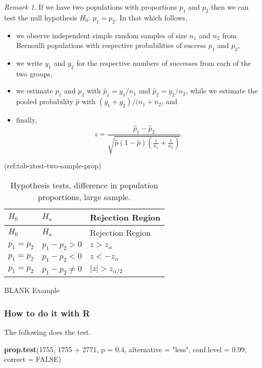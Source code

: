 \documentclass[]{book}
\newenvironment{Shaded}{\begin{snugshade}}{\end{snugshade}}
\newcommand{\KeywordTok}[1]{\textcolor[rgb]{0.13,0.29,0.53}{\textbf{{#1}}}}
\newcommand{\DataTypeTok}[1]{\textcolor[rgb]{0.13,0.29,0.53}{{#1}}}
\newcommand{\DecValTok}[1]{\textcolor[rgb]{0.00,0.00,0.81}{{#1}}}
\newcommand{\FloatTok}[1]{\textcolor[rgb]{0.00,0.00,0.81}{{#1}}}
\newcommand{\StringTok}[1]{\textcolor[rgb]{0.31,0.60,0.02}{{#1}}}
\newcommand{\OtherTok}[1]{\textcolor[rgb]{0.56,0.35,0.01}{{#1}}}
\newcommand{\NormalTok}[1]{{#1}}
\providecommand{\tightlist}{%
  \setlength{\itemsep}{0pt}\setlength{\parskip}{0pt}}
\numberwithin{equation}{chapter}
\numberwithin{figure}{chapter}
\theoremstyle{plain}
\theoremstyle{definition}
\theoremstyle{remark}
\theoremstyle{definition}
\theoremstyle{definition}
\theoremstyle{remark}
\newtheorem*{remark}{Remark}
\begin{document}
\begin{remark}
If we have two populations with proportions \(p_{1}\) and \(p_{2}\) then
we can test the null hypothesis \(H_{0}:\,p_{1} = p_{2}\). In that which
follows,

\begin{itemize}
\tightlist
\item
  we observe independent simple random samples of size \(n_{1}\) and
  \(n_{2}\) from Bernoulli populations with respective probabilities of
  success \(p_{1}\) and \(p_{2}\),
\item
  we write \(y_{1}\) and \(y_{2}\) for the respective numbers of
  successes from each of the two groups,
\item
  we estimate \(p_{1}\) and \(p_{2}\) with
  \(\hat{p}_{1} = y_{1}/n_{1}  \) and \(\hat{p}_{2} = y_{2}/n_{2}\),
  while we estimate the pooled probability \(\hat{p}\) with
  \((y_{1} + y_{2})/(n_{1} + n_{2}\), and
\item
  finally,
  \[z = \frac{\hat{p}_{1} - \hat{p}_{2}}{\sqrt{\hat{p}(1 - \hat{p})\left( \frac{1}{n_{1}} + \frac{1}{n_{2}} \right)}}. \]
\end{itemize}
\end{remark}

\bigskip

(ref:tab-ztest-two-sample-prop)

\begin{longtable}[]{@{}lll@{}}
\caption{Hypothesis tests, difference in population proportions, large
sample.}\tabularnewline
\toprule
\(H_{0}\) & \(H_{a}\) & Rejection Region\tabularnewline
\midrule
\endfirsthead
\toprule
\(H_{0}\) & \(H_{a}\) & Rejection Region\tabularnewline
\midrule
\endhead
\(p_{1} = p_{2}\) & \(p_{1} - p_{2} > 0\) &
\(z > z_{\alpha}\)\tabularnewline
\(p_{1} = p_{2}\) & \(p_{1} - p_{2} < 0\) &
\(z < -z_{\alpha}\)\tabularnewline
\(p_{1} = p_{2}\) & \(p_{1} - p_{2} \neq 0\) &
\(\vert z \vert > z_{\alpha/2}\)\tabularnewline
\bottomrule
\end{longtable}

BLANK Example

\subsubsection{How to do it with R}\label{how-to-do-it-with-r-39}

The following does the test.

\begin{Shaded}
\begin{Highlighting}[]
\KeywordTok{prop.test}\NormalTok{(}\DecValTok{1755}\NormalTok{, }\DecValTok{1755} \NormalTok{+}\StringTok{ }\DecValTok{2771}\NormalTok{, }\DataTypeTok{p =} \FloatTok{0.4}\NormalTok{, }\DataTypeTok{alternative =} \StringTok{"less"}\NormalTok{, }
          \DataTypeTok{conf.level =} \FloatTok{0.99}\NormalTok{, }\DataTypeTok{correct =} \OtherTok{FALSE}\NormalTok{)}
\end{Highlighting}
\end{Shaded}
\end{document}
